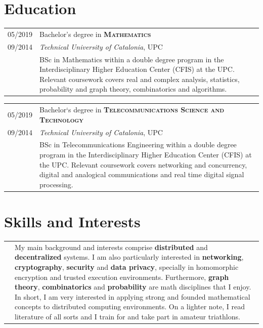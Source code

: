 \documentclass[a4paper,10pt]{article} %
\begin{document}
\section{Education}

\begin{tabular}{R{1.5cm}|p{13.8cm}}	
    \textsc{05/2019} & Bachelor's degree in \textbf{\textsc{Mathematics}} \\ 
    \textsc{09/2014} & \small{\emph{Technical University of Catalonia}, UPC}\\
     & \footnotesize{BSc in Mathematics within a double degree program in the Interdisciplinary Higher Education Center (CFIS) at the UPC. Relevant coursework covers real and complex analysis, statistics, probability and graph theory, combinatorics and algorithms.}
\end{tabular}

\begin{tabular}{R{1.5cm}|p{13.8cm}}	
    \textsc{05/2019} &  Bachelor`s degree in \textbf{\textsc{Telecommunications Science and Technology}}\\ 
    \textsc{09/2014} & \small{\emph{Technical University of Catalonia}, UPC} \\
     & \footnotesize{BSc in Telecommunications Engineering within a double degree program in the Interdisciplinary Higher Education Center (CFIS) at the UPC. Relevant coursework covers networking and concurrency, digital and analogical communications and real time digital signal processing.}
\end{tabular}


\section{Skills and Interests}

\begin{tabular}{R{1.5cm}|p{13.8cm}}
    & {My main background and interests comprise \textbf{distributed} and \textbf{decentralized} systems. I am also particularly interested in \textbf{networking}, \textbf{cryptography}, \textbf{security} and \textbf{data privacy}, specially in homomorphic encryption and trusted execution environments. Furthermore, \textbf{graph theory}, \textbf{combinatorics} and \textbf{probability} are math disciplines that I enjoy. In short, I am very interested in applying strong and founded mathematical concepts to distributed computing environments. On a lighter note, I read literature of all sorts and I train for and take part in amateur triathlons.}  \\
\end{tabular}
\end{document}
